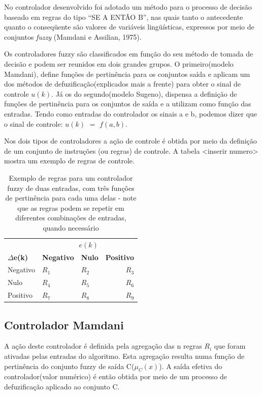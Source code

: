 \documentclass[conference]{IEEEtran}
\begin{document}
No controlador desenvolvido foi adotado um método para o processo de decisão baseado em regras do tipo “SE A ENTÃO B”, nas quais tanto o antecedente quanto o conseqüente são valores de variáveis lingüísticas, expressos por meio de conjuntos \textit{fuzzy} (Mamdani e Assilian, 1975). 

Os controladores fuzzy são classificados em função do seu método de tomada de decisão e podem ser reunidos em dois grandes grupos. O primeiro(modelo Mamdani),  define funções de pertinência para os conjuntos saída e  aplicam um dos métodos de defuzificação(explicados mais a frente)  para  obter o sinal de controle $u(k)$. Já os do segundo(modelo Sugeno), dispensa a definição de funções de pertinência para os conjuntos de saída e a utilizam como função das entradas. Tendo como entradas do controlador os sinais a e b, podemos dizer que o sinal de controle: $u(k)$ $=$ $f(a,b)$.

Nos dois tipos de controladores a ação de controle é obtida por meio da definição de um conjunto de instruções (ou regras) de controle. A tabela <inserir numero> mostra um exemplo de regras de controle.

\begin{table}[!ht]
\caption{Exemplo de regras para um controlador fuzzy de duas entradas,  com três funções de pertinência para cada uma delas - note que as regras podem se repetir em diferentes combinações de entradas, quando necessário}
\centering
\begin{tabular}{lllr}
\toprule
\multicolumn{3}{r}{\textbf{$e(k)$}} \\
\cmidrule(r){2-4}
\textbf{$\Delta$e(k)} & \textbf{Negativo} & \textbf{Nulo} & \textbf{Positivo} \\
Negativo & $R_1$ & $R_2$ & $R_3$ \\
Nulo & $R_4$ & $R_5$ & $R_6$ \\
Positivo & $R_7$ & $R_8$ & $R_9$ \\
\bottomrule
\end{tabular}
\end{table}

\subsection{Controlador Mamdani}

A ação deste controlador é definida pela agregação das n regras $R_i$ que foram ativadas pelas entradas do algoritmo. Esta agregação resulta numa função de pertinência do conjunto fuzzy de saída C($\mu_C(x)$). A saída efetiva do controlador(valor numérico) é então obtida por meio de um processo de defuzificação aplicado ao conjunto C. 
\end{document}
